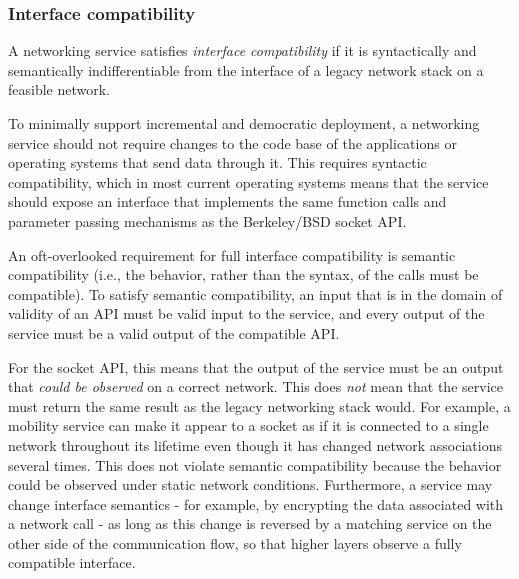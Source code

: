 \subsubsection{Interface compatibility}

A networking service satisfies \textit{interface compatibility}
if it is syntactically and semantically indifferentiable
from the interface of a legacy network stack on a feasible network.


To minimally support incremental and democratic deployment,
a networking service should not require changes to 
the code base of the applications or operating systems 
that send data through it.
This requires syntactic compatibility,
which in most current operating systems means that the service 
should expose an interface that implements
the same function calls and parameter passing mechanisms as
the Berkeley/BSD socket API.

An oft-overlooked requirement for full interface compatibility 
is semantic compatibility (i.e., the behavior, rather than the 
syntax, of the calls must be compatible).
To satisfy semantic compatibility, an input that 
is in the domain of validity of an API
must be valid input to the service, and every output of the service
must be a valid output of the compatible API.

For the socket API, this means that the output of the service 
must be an output that \textit{could be observed} on a correct network.
This does \textit{not} mean that the service must return the same
result as the legacy networking stack would. For example, 
a mobility service can make it appear to a socket as if 
it is connected to a single network throughout its lifetime even
though it has changed network associations several times. 
This does not violate semantic compatibility because
the behavior could be observed under static network conditions.
Furthermore, a service may change interface semantics - for example, 
by encrypting the data associated with a network call - as long as this 
change is reversed by a matching service on the other side of the 
communication flow, so that higher layers 
observe a fully compatible interface.

